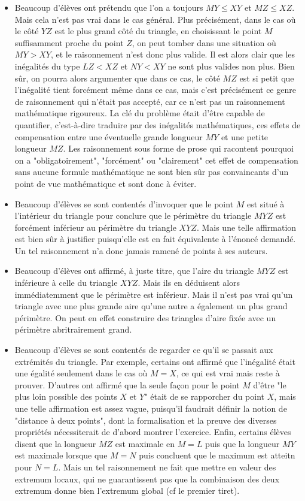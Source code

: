 \begin{itemize}
\item Beaucoup d'élèves ont prétendu que l'on a toujours $MY\le XY$ et $MZ\le XZ$. Mais cela n'est pas vrai dans le cas général. Plus précisément, dans le cas où le côté $YZ$ est le plus grand côté du triangle, en choisissant le point $M$ suffisamment proche du point $Z$, on peut tomber dans une situation où $MY>XY$, et le raisonnement n'est donc plus valide. Il est alors clair que les inégalités du type $LZ<XZ$ et $NY<XY$ ne sont plus valides non plus. Bien sûr, on pourra alors argumenter que dans ce cas, le côté $MZ$ est si petit que l'inégalité tient forcément même dans ce cas, mais c'est précisément ce genre de raisonnement qui n'était pas accepté, car ce n'est pas un raisonnement mathématique rigoureux. La clé du problème était d'être capable de quantifier, c'est-à-dire traduire par des inégalités mathématiques, ces effets de compensation entre une éventuelle grande longueur $MY$ et une petite longueur $MZ$. Les raisonnement sous forme de prose qui racontent pourquoi on a "obligatoirement", "forcément" ou "clairement" cet effet de compensation sans aucune formule mathématique ne sont bien sûr pas convaincants d'un point de vue mathématique et sont donc à éviter.   
\item Beaucoup d'élèves se sont contentés d'invoquer que le point $M$ est situé à l'intérieur du triangle pour conclure que le périmètre du triangle $MYZ$ est forcément inférieur au périmètre du triangle $XYZ$. Mais une telle affirmation est bien sûr à justifier puisqu'elle est en fait équivalente à l'énoncé demandé. Un tel raisonnement n'a donc jamais ramené de points à ses auteurs. 
\item Beaucoup d'élèves ont affirmé, à juste titre, que l'aire du triangle $MYZ$ est inférieure à celle du triangle $XYZ$. Mais ils en déduisent alors immédiatemment que le périmètre est inférieur. Mais il n'est pas vrai qu'un triangle avec une plus grande aire qu'une autre a également un plus grand périmètre. On peut en effet construire des triangles d'aire fixée avec un périmètre abritrairement grand. 
\item Beaucoup d'élèves se sont contentés de regarder ce qu'il se passait aux extrémités du triangle. Par exemple, certains ont affirmé que l'inégalité était une égalité seulement dans le cas où $M=X$, ce qui est vrai mais reste à prouver. D'autres ont affirmé que la seule façon pour le point $M$ d'être "le plus loin possible des points $X$ et $Y$" était de se rapporcher du point $X$, mais une telle affirmation est assez vague, puisqu'il faudrait définir la notion de "distance à deux points", dont la formalisation et la preuve des diverses propriétés nécessiterait de d'abord montrer l'exercice. Enfin, certains élèves disent que la longueur $MZ$ est maximale en $M=L$ puis que la longueur $MY$ est maximale lorsque que $M=N$ puis concluent que le maximum est atteitn pour $N=L$. Mais un tel raisonnement ne fait que mettre en valeur des extremum locaux, qui ne guarantissent pas que la combinaison des deux extremum donne bien l'extremum global (cf le premier tiret). 
\end{itemize}
